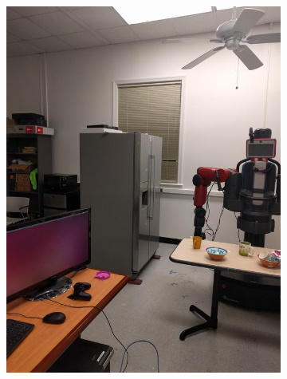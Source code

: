 \documentclass[12pt]{article}
\begin{document}
\begin{figure}[t!]
\begin{subfigure}[t]{0.1\textwidth}
        \includegraphics[width=\linewidth]{../Images/Set3/3}
    \end{subfigure}
    \begin{subfigure}[t]{0.1\textwidth}
        \centering

\end{subfigure}
\end{figure}
\end{document}
